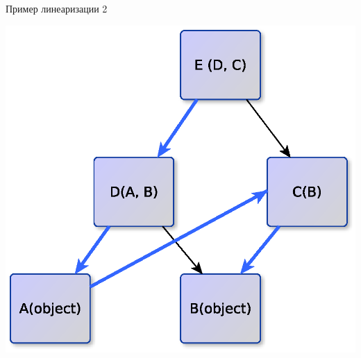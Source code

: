 \documentclass{article}
\begin{document}
\begin{center}Пример линеаризации 2\end{center}
\begin{center} \includegraphics{images/inheritance_2.eps} \end{center} 
\newpage
\end{document}
